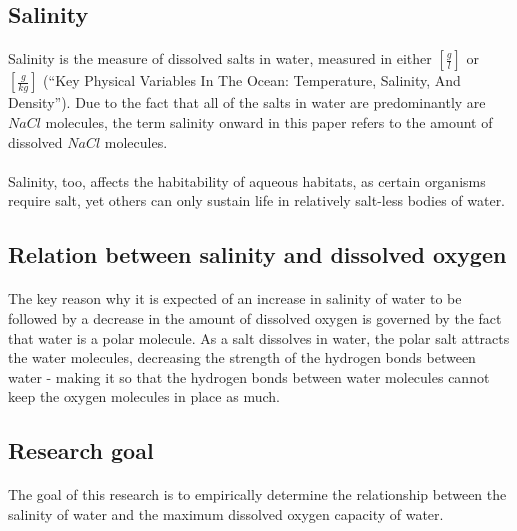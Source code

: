 \documentclass[a4paper]{article}
\begin{document}
\subsection{Salinity}

\paragraph*{}
Salinity is the measure of dissolved salts in water, measured in either $\left[
\frac{\si{g}}{\si{l}} \right]$ or $\left[ \frac{g}{kg} \right]$ (``Key Physical
Variables In The Ocean: Temperature, Salinity, And Density''). Due to the fact
that all of the salts in water are predominantly are $NaCl$ molecules, the term
salinity onward in this paper refers to the amount of dissolved $NaCl$
molecules.

\paragraph*{}
Salinity, too, affects the habitability of aqueous habitats, as certain
organisms require salt, yet others can only sustain life in relatively
salt-less bodies of water.

\subsection{Relation between salinity and dissolved oxygen}

\paragraph*{}
The key reason why it is expected of an increase in salinity of water to be
followed by a decrease in the amount of dissolved oxygen is governed by the
fact that water is a polar molecule. As a salt dissolves in water, the polar
salt attracts the water molecules, decreasing the strength of the hydrogen
bonds between water - making it so that the hydrogen bonds between water
molecules cannot keep the oxygen molecules in place as much.

\subsection{Research goal}

\paragraph*{}
The goal of this research is to empirically determine the relationship between
the salinity of water and the maximum dissolved oxygen capacity of water.
\end{document}

